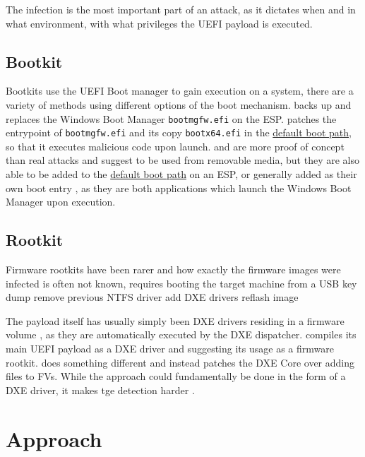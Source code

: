 The infection is the most important part of an attack, as it dictates when and in what environment, with what privileges the \ac{UEFI} payload is executed.

\subsection{Bootkit}

Bootkits use the \ac{UEFI} Boot manager to gain execution on a system, there are a variety of methods using different options of the boot mechanism.
\cite{finspy} backs up and replaces the Windows Boot Manager \lstinline{bootmgfw.efi} on the \ac{ESP}.
\cite{especter} patches the entrypoint of \lstinline{bootmgfw.efi} and its copy \lstinline{bootx64.efi} in the \hyperref[sec:uefi-pi:uefi:boot-manager]{default boot path}, so that it executes malicious code upon launch.
\cite{dreamboot} and \cite{efiguard} are more proof of concept than real attacks and suggest to be used from removable media, but they are also able to be added to the \hyperref[sec:uefi-pi:uefi:boot-manager]{default boot path} on an \ac{ESP}, or generally added as their own boot entry \cite{efiguard}, as they are both applications which launch the Windows Boot Manager upon execution.
\subsection{Rootkit}


Firmware rootkits have been rarer and how exactly the firmware images were infected is often not known,
\cite{vector-edk} requires booting the target machine from a USB key \cite{mosaicregressor}
 \cite{lojax}
dump
remove previous NTFS driver
add DXE drivers
reflash image

The payload itself has usually simply been \ac{DXE} drivers residing in a firmware volume \cite{mosaicregressor,lojax}, as they are automatically executed by the \ac{DXE} dispatcher. \cite{efiguard} compiles its main \ac{UEFI} payload as a \ac{DXE} driver and suggesting its usage as a firmware rootkit. \cite{moonbounce} does something different and instead patches the \ac{DXE} Core over adding files to \acp{FV}. While the approach could fundamentally be done in the form of a \ac{DXE} driver, it makes tge detection harder \cite{moonbounce}.

\section{Approach}


